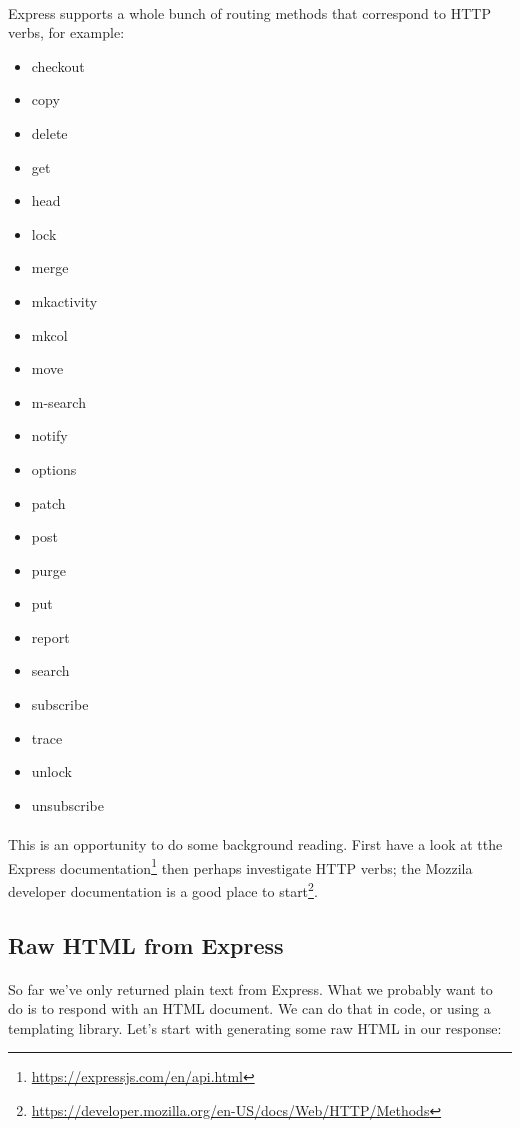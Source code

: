 \documentclass[10pt, a4paper, twosize]{article}
\begin{document}
\paragraph{} Express supports a whole bunch of routing methods that correspond to HTTP verbs, for example:

\begin{multicols}{3}
\begin{itemize}
\item checkout
\item copy
\item delete
\item get
\item head
\item lock
\item merge
\item mkactivity
\item mkcol
\item move
\item m-search
\item notify
\item options
\item patch
\item post
\item purge
\item put
\item report
\item search
\item subscribe
\item trace
\item unlock
\item unsubscribe
\end{itemize}
\end{multicols}

\paragraph{} This is an opportunity to do some background reading. First have a look at tthe Express documentation\footnote{\url{https://expressjs.com/en/api.html}} then perhaps investigate HTTP verbs; the Mozzila developer documentation is a good place to start\footnote{\url{https://developer.mozilla.org/en-US/docs/Web/HTTP/Methods}}.

\subsection{Raw HTML from Express}
\paragraph{} So far we've only returned plain text from Express. What we probably want to do is to respond with an HTML document. We can do that in code, or using a templating library. Let's start with generating some raw HTML in our response:
\end{document}

